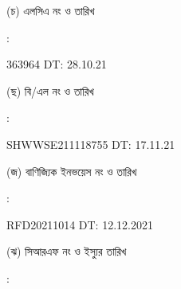 \documentclass[12pt]{article}
\newcommand{\blno}{SHWWSE211118755}
\newcommand{\bldt}{17.11.21}
\newcommand{\lcdt}{28.10.21}
\newcommand{\lcano}{363964}
\newcommand{\lcadt}{\lcdt}
\newcommand{\invno}{RFD20211014}
\newcommand{\invdt}{12.12.2021}
\begin{document}
\begin{minipage}[t]{0.05\linewidth}
\hspace*{1em}
\end{minipage}
\begin{minipage}[t]{0.40\linewidth}
(চ) এলসিএ নং ও তারিখ
\end{minipage}
\begin{minipage}[t]{0.02\linewidth}
:
\end{minipage}
\begin{minipage}[t]{0.53\linewidth}
{\lcano} \hspace{2em} DT: {\lcadt}
\\
\end{minipage}
\begin{minipage}[t]{0.05\linewidth}
\hspace*{1em}
\end{minipage}
\begin{minipage}[t]{0.40\linewidth}
(ছ) বি/এল নং ও তারিখ
\end{minipage}
\begin{minipage}[t]{0.02\linewidth}
:
\end{minipage}
\begin{minipage}[t]{0.53\linewidth}
{\blno} \hspace{2em} DT: {\bldt}
\\
\end{minipage}
\begin{minipage}[t]{0.05\linewidth}
\hspace*{1em}
\end{minipage}
\begin{minipage}[t]{0.40\linewidth}
(জ) বাণিজ্যিক ইনভয়েস নং ও তারিখ
\end{minipage}
\begin{minipage}[t]{0.02\linewidth}
:
\end{minipage}
\begin{minipage}[t]{0.53\linewidth}
{\invno} \hspace{2em} DT: {\invdt}
\\
\end{minipage}
\begin{minipage}[t]{0.05\linewidth}
\hspace*{1em}
\end{minipage}
\begin{minipage}[t]{0.40\linewidth}
(ঝ) সিআরএফ নং ও ইস্যুর তারিখ
\end{minipage}
\begin{minipage}[t]{0.02\linewidth}
:
\end{minipage}
\end{document}
